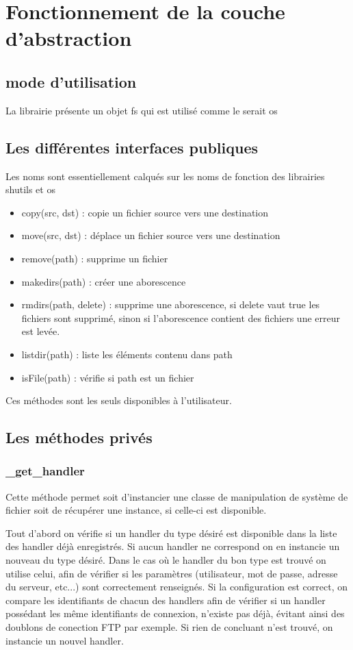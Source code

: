 \section*{Fonctionnement de la couche d'abstraction}
\subsection*{mode d'utilisation}
La librairie présente un objet fs qui est utilisé comme le serait os

\newpage

\subsection*{Les différentes interfaces publiques}
Les noms sont essentiellement calqués sur les noms de fonction des librairies shutils et os

\begin{itemize}
\item copy(src, dst) : copie un fichier source vers une destination
\item move(src, dst) : déplace un fichier source vers une destination
\item remove(path) : supprime un fichier
\item makedirs(path) : créer une aborescence
\item rmdirs(path, delete) : supprime une aborescence, si delete vaut true les fichiers sont supprimé, sinon si l'aborescence contient des fichiers une erreur est levée.
\item listdir(path) : liste les éléments contenu dans path
\item isFile(path) : vérifie si path est un fichier 
\end{itemize}

Ces méthodes sont les seuls disponibles à l'utilisateur.

\subsection*{Les méthodes privés}
\subsubsection*{\_get\_handler}
Cette méthode permet soit d'instancier une classe de manipulation de système de fichier soit de récupérer une instance, si celle-ci est disponible.

Tout d'abord on vérifie si un handler du type désiré est disponible dans la liste des handler déjà enregistrés. Si aucun handler ne correspond on en instancie un nouveau du type désiré.
Dans le cas où le handler du bon type est trouvé on utilise celui, afin de vérifier si les paramètres (utilisateur, mot de passe, adresse du serveur, etc...) sont correctement renseignés.
Si la configuration est correct, on compare les identifiants de chacun des handlers afin de vérifier si un handler possédant les même identifiants de connexion, n'existe pas déjà, évitant ainsi des doublons de conection FTP par exemple.
Si rien de concluant n'est trouvé, on instancie un nouvel handler.


